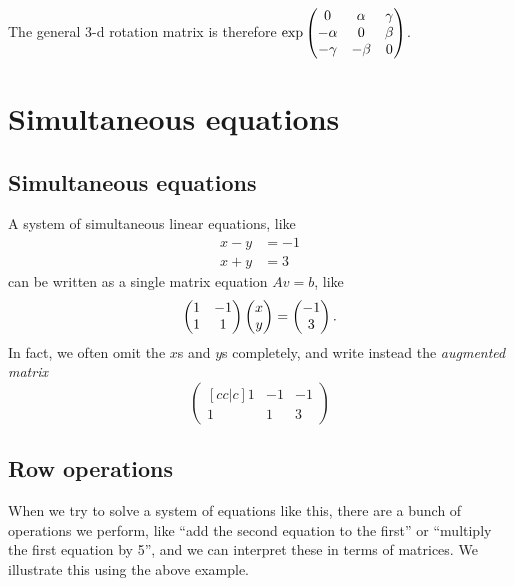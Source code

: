 \documentclass{article}
\begin{document}
\begin{Example}
The general 3-d rotation matrix is therefore \(\exp\begin{pmatrix} 0 & \alpha &
\gamma \\ -\alpha & 0 & \beta \\ -\gamma & -\beta & 0\end{pmatrix}\).


\end{Example}
\clearpage
\section{Simultaneous equations}
\subsection{Simultaneous equations}
A system of simultaneous linear equations, like
\begin{align*}
x-y&=-1\\
x+y&=3
\end{align*}
can be written as a single matrix equation \(Av=b\), like
\[\begin{pmatrix} 1 & -1 \\ 1 & 1 \end{pmatrix}\begin{pmatrix} x \\ y \end{pmatrix}=\begin{pmatrix} -1 \\ 3\end{pmatrix}.\]
In fact, we often omit the \(x\)s and \(y\)s completely, and write
instead the {\em augmented matrix}
\[\begin{pmatrix}[cc|c]
1 & -1 & -1 \\ 1 & 1 & 3
\end{pmatrix}\]


\subsection{Row operations}


When we try to solve a system of equations like this, there are a
bunch of operations we perform, like ``add the second equation to the
first'' or ``multiply the first equation by 5'', and we can interpret
these in terms of matrices. We illustrate this using the above
example.
\end{document}
